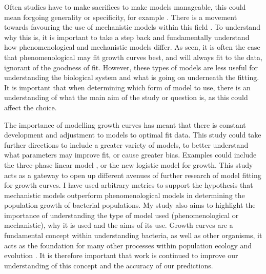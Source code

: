 \documentclass[11pt]{article}
\begin{document}
Often studies have to make sacrifices to make models manageable, this could mean forgoing generality or specificity, for example \cite{levins_strategy_1966,smith-simpson_estimating_2007}. There is a movement towards favouring the use of mechanistic models within this field \cite{baranyi_dynamic_1994,zwietering_modeling_1990}. To understand why this is, it is important to take a step back and fundamentally understand how phenomenological and mechanistic models differ. As seen, it is often the case that phenomenological may fit growth curves best, and will always fit to the data, ignorant of the goodness of fit. However, these types of models are less useful for understanding the biological system and what is going on underneath the fitting. It is important that when determining which form of model to use, there is an understanding of what the main aim of the study or question is, as this could affect the choice. 

The importance of modelling growth curves has meant that there is constant development and adjustment to models to optimal fit data. This study could take further directions to include a greater variety of models, to better understand what parameters may improve fit, or cause greater bias. Examples could include the three-phase linear model \cite{buchanan_when_1997}, or the new logistic model for growth\cite{fujikawa_new_2004}. This study acts as a gateway to open up different avenues of further research of model fitting for growth curves. I have used arbitrary metrics to support the hypothesis that mechanistic models outperform phenomenological models in determining the population growth of bacterial populations. My study also aims to highlight the importance of understanding the type of model used (phenomenological or mechanistic), why it is used and the aims of its use. Growth curves are a fundamental concept within understanding bacteria, as well as other organisms, it acts as the foundation for many other processes within population ecology and evolution \cite{sibly_population_2002}. It is therefore important that work is continued to improve our understanding of this concept and the accuracy of our predictions. 





\end{document}
